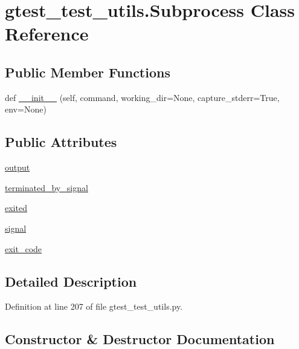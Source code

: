 \hypertarget{classgtest__test__utils_1_1_subprocess}{}\section{gtest\+\_\+test\+\_\+utils.\+Subprocess Class Reference}
\label{classgtest__test__utils_1_1_subprocess}
\subsection*{Public Member Functions}
\begin{DoxyCompactItemize}
\item 
def \hyperlink{classgtest__test__utils_1_1_subprocess_a452a9e7d9988cc96e71b6fa09bbaddca}{\+\_\+\+\_\+init\+\_\+\+\_\+} (self, command, working\+\_\+dir=None, capture\+\_\+stderr=True, env=None)
\end{DoxyCompactItemize}
\subsection*{Public Attributes}
\begin{DoxyCompactItemize}
\item 
\hyperlink{classgtest__test__utils_1_1_subprocess_a170f722b867e51f3e97b5b60399988cf}{output}
\item 
\hyperlink{classgtest__test__utils_1_1_subprocess_a9654b9eddd43c93acf66d5c7b0026fca}{terminated\+\_\+by\+\_\+signal}
\item 
\hyperlink{classgtest__test__utils_1_1_subprocess_a020b5fa8268b9eaf1c4a57cbd53c104d}{exited}
\item 
\hyperlink{classgtest__test__utils_1_1_subprocess_af083cd9621a5d5346ffe800191678ea3}{signal}
\item 
\hyperlink{classgtest__test__utils_1_1_subprocess_a01acee4476fd01ccf017d1351cf46c08}{exit\+\_\+code}
\end{DoxyCompactItemize}


\subsection{Detailed Description}


Definition at line 207 of file gtest\+\_\+test\+\_\+utils.\+py.



\subsection{Constructor \& Destructor Documentation}

